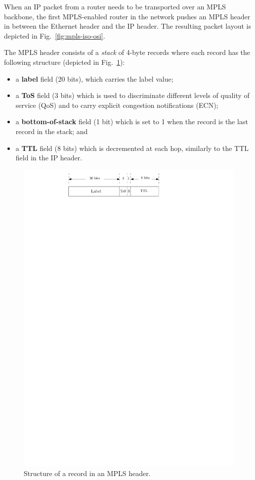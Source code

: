 \documentclass{article}
\begin{document}
When an IP packet from a 
router needs to be transported over an MPLS 
backbone, the first MPLS-enabled router in the network pushes an MPLS header in 
between the Ethernet header and the IP header. The resulting packet layout is 
depicted in Fig.~\ref{fig:mpls-iso-osi}. 

The MPLS header consists of a \emph{stack} of 4-byte records where each record 
has the following structure (depicted in Fig.~\ref{fig:mpls-header}): 
\begin{itemize}
 \item a \textbf{label} field (20 bits), which carries the label value;
 \item a \textbf{ToS} field (3 bits) which is used to discriminate different 
levels of quality of service (QoS) and to carry explicit congestion 
notifications (ECN);
 \item a \textbf{bottom-of-stack} field (1 bit) which is set to 1 when the 
record is the last record in the stack; and
 \item a \textbf{TTL} field (8 bits) which is decremented at each hop, 
similarly to the TTL field in the IP header.
\end{itemize}

\begin{figure}
 \centering
 \includegraphics[width=0.7\columnwidth]{figures/mpls-header}
 \caption{Structure of a record in an MPLS header.}
 \label{fig:mpls-header}
\end{figure}
\end{document}
